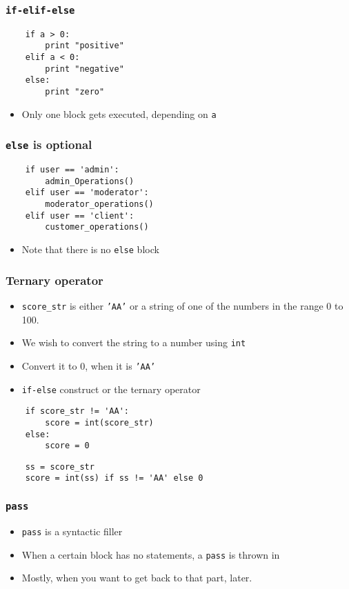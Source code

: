 \begin{frame}[fragile]
  \frametitle{\texttt{if-elif-else}}
  \begin{lstlisting}
    if a > 0:           
        print "positive"
    elif a < 0:         
        print "negative"
    else:               
        print "zero"    
  \end{lstlisting}
  \begin{itemize}
  \item Only one block gets executed, depending on \texttt{a}
  \end{itemize}
\end{frame}

\begin{frame}[fragile]
  \frametitle{\texttt{else} is optional}
  \begin{lstlisting}
    if user == 'admin':         
        admin_Operations()
    elif user == 'moderator':   
        moderator_operations()
    elif user == 'client':      
        customer_operations()
  \end{lstlisting}
  \begin{itemize}
  \item Note that there is no \texttt{else} block
  \end{itemize}
\end{frame}

\begin{frame}[fragile]
  \frametitle{Ternary operator}
  \begin{itemize}
  \item \texttt{score\_str} is either \texttt{'AA'} or a string of one
    of the numbers in the range 0 to 100. 
  \item We wish to convert the string to a number using \texttt{int}
  \item Convert it to 0, when it is \texttt{'AA'}
  \item \texttt{if-else} construct or the ternary operator
  \end{itemize}
  \begin{lstlisting}
    if score_str != 'AA':
        score = int(score_str)
    else:
        score = 0
  \end{lstlisting}
  \begin{lstlisting}
    ss = score_str
    score = int(ss) if ss != 'AA' else 0
  \end{lstlisting}
\end{frame}


\begin{frame}[fragile]
  \frametitle{\texttt{pass}}
  \begin{itemize}
  \item \texttt{pass} is a syntactic filler
  \item When a certain block has no statements, a \texttt{pass} is
    thrown in
  \item Mostly, when you want to get back to that part, later.
  \end{itemize}
\end{frame}

